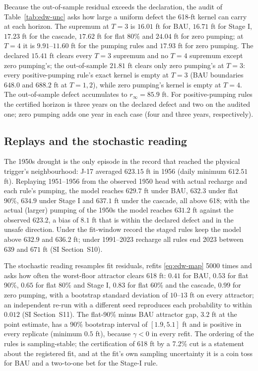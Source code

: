 Because the out-of-sample residual exceeds the declaration, the audit of Table~\ref{tab:edw-unc} asks how large a uniform defect the 618-ft kernel can carry at each horizon. The supremum at $T=3$ is $16.01$ ft for BAU, $16.71$ ft for Stage I, $17.23$ ft for the cascade, $17.62$ ft for flat 80\% and $24.04$ ft for zero pumping; at $T=4$ it is $9.91$--$11.60$ ft for the pumping rules and $17.93$ ft for zero pumping. The declared $15.41$ ft clears every $T=3$ supremum and no $T=4$ supremum except zero pumping's; the out-of-sample $21.81$ ft clears only zero pumping's at $T=3$: every positive-pumping rule's exact kernel is empty at $T=3$ (BAU boundaries $648.0$ and $688.2$ ft at $T=1,2$), while zero pumping's kernel is empty at $T=4$. The out-of-sample defect accumulates to $r_\infty=85.9$ ft. For positive-pumping rules the certified horizon is three years on the declared defect and two on the audited one; zero pumping adds one year in each case (four and three years, respectively).



\subsection{Replays and the stochastic reading}\label{sec:edw-stoch}

The 1950s drought is the only episode in the record that reached the physical trigger's neighbourhood: J-17 averaged $623.15$ ft in 1956 (daily minimum $612.51$ ft). Replaying 1951--1956 from the observed 1950 head with actual recharge and each rule's pumping, the model reaches $629.7$ ft under BAU, $632.3$ under flat 90\%, $634.9$ under Stage I and $637.1$ ft under the cascade, all above 618; with the actual (larger) pumping of the 1950s the model reaches $631.2$ ft against the observed $623.2$, a bias of $8.1$ ft that is within the declared defect and in the unsafe direction. Under the fit-window record the staged rules keep the model above $632.9$ and $636.2$ ft; under 1991--2023 recharge all rules end 2023 between $639$ and $671$ ft (SI Section~S10).

The stochastic reading resamples fit residuals, refits \eqref{eq:edw-map} 5000 times and asks how often the worst-floor attractor clears 618 ft: $0.41$ for BAU, $0.53$ for flat 90\%, $0.65$ for flat 80\% and Stage I, $0.83$ for flat 60\% and the cascade, $0.99$ for zero pumping, with a bootstrap standard deviation of $10$--$13$ ft on every attractor; an independent re-run with a different seed reproduces each probability to within $0.012$ (SI Section~S11). The flat-90\% minus BAU attractor gap, $3.2$ ft at the point estimate, has a 90\% bootstrap interval of $[1.9,5.1]$ ft and is positive in every replicate (minimum $0.5$ ft), because $\gamma<0$ in every refit. The ordering of the rules is sampling-stable; the certification of 618 ft by a 7.2\% cut is a statement about the registered fit, and at the fit's own sampling uncertainty it is a coin toss for BAU and a two-to-one bet for the Stage-I rule.

